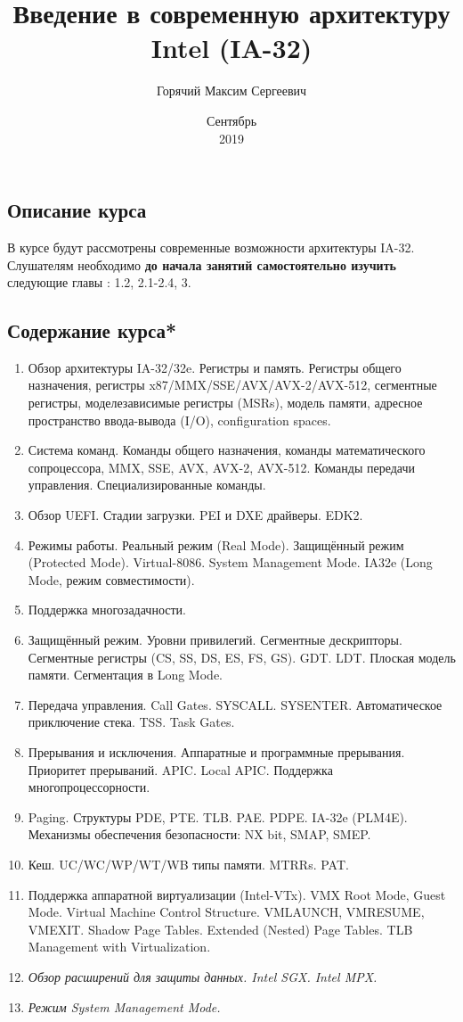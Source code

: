 \documentclass[english,russian,12pt]{article}
\title{Введение в современную архитектуру Intel (IA-32)}
\date{Сентябрь\\ 2019}
\author{Горячий Максим Сергеевич}
\begin{document}
\maketitle

\subsection*{Описание курса}
В курсе будут рассмотрены современные возможности архитектуры IA-32. Слушателям необходимо {\bf до начала занятий самостоятельно изучить} следующие главы \cite{Zubkov}: 1.2, 2.1-2.4, 3.


\subsection*{Содержание курса*}
\begin{enumerate}
  \item Обзор архитектуры IA-32/32e. Регистры и память. Регистры общего назначения, регистры x87/MMX/SSE/AVX/AVX-2/AVX-512, сегментные регистры, моделезависимые регистры (MSRs), модель памяти, адресное пространство ввода-вывода (I/O), configuration spaces.
  \item Система команд. Команды общего назначения, команды математического сопроцессора, MMX, SSE, AVX, AVX-2, AVX-512. Команды передачи управления. Специализированные команды.
  \item Обзор UEFI. Стадии загрузки. PEI и DXE драйверы. EDK2.
  \item Режимы работы. Реальный режим (Real Mode). Защищённый режим (Protected Mode).  Virtual-8086. System Management Mode. IA32e (Long Mode, режим совместимости).
  \item Поддержка многозадачности.
  \item Защищённый режим. Уровни привилегий. Сегментные дескрипторы. Сегментные регистры (CS, SS, DS, ES, FS, GS). GDT. LDT. Плоская модель памяти. Сегментация в Long Mode.
  \item Передача управления. Call Gates. SYSCALL. SYSENTER. Автоматическое приключение стека. TSS. Task Gates.
  \item Прерывания и исключения. Аппаратные и программные прерывания. Приоритет прерываний. APIC. Local APIC. Поддержка многопроцессорности.
  \item Paging. Структуры PDE, PTE. TLB. PAE. PDPE. IA-32e (PLM4E). Механизмы обеспечения безопасности: NX bit, SMAP, SMEP.
  \item Кеш. UC/WC/WP/WT/WB типы памяти. MTRRs. PAT.
  \item Поддержка аппаратной виртуализации (Intel-VTx). VMX Root Mode, Guest Mode. Virtual Machine Control Structure. VMLAUNCH, VMRESUME, VMEXIT. Shadow Page Tables. Extended (Nested) Page Tables. TLB Management with Virtualization.
  \item {\it Обзор расширений для защиты данных. Intel SGX. Intel MPX.}
  \item {\it Режим System Management Mode.}
\end{enumerate}
\end{document}
